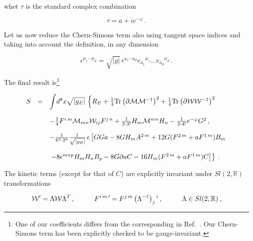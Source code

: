 \documentclass[12pt,a4paper]{article}
\begin{document}
\noindent whet $\tau$ is the standard complex combination

\begin{equation}
\tau= a+ie^{-\varphi}\, .  
\end{equation}
 
Let us now reduce the Chern-Simons term also using tangent space indices
and taking into account the definition, in any dimension

\begin{equation}
\epsilon^{\mu_{1}\cdots\mu_{d}} = \sqrt{|g|}\, \epsilon^{a_{1}\cdots a_{d}} 
e_{a_{1}}{}^{\mu_{1}} \ldots e_{a_{d}}{}^{\mu_{d}} \, .
\end{equation}

The final result is\footnote{One of our coefficients differs from the
  corresponding in Ref.~\cite{kn:SaSe}. Our Chern-Simons term has been
  explicitly checked to be gauge-invariant.}

\begin{equation}
\label{eq:d8masslessaction}
  \begin{array}{rcl}
S & = & {\displaystyle\int} d^{8}x \sqrt{|g_{E}|}\,
\left\{ 
R_{E} 
+\frac{1}{4}{\rm Tr}\left(\partial {\cal M}{\cal M}^{-1}\right)^{2}
+\frac{1}{4}{\rm Tr}\left(\partial {\cal W}{\cal W}^{-1}\right)^{2}
 \right.\\
& & \\
& & 
-\frac{1}{4}F^{i\, m}{\cal M}_{mn}{\cal W}_{ij} F^{j\, n}
+\frac{1}{2\cdot 3!} H_{m}{\cal M}^{mn} H_{n}
-\frac{1}{2\cdot 4!} e^{-\varphi} G^{2} \, ,\\
& & \\
& & 
-\frac{1}{6^{3}\cdot 2^{4}}
{\textstyle\frac{1}{\sqrt{|g_{E}|}}}\, \epsilon
\left[GGa -8G H_{m} A^{2\, m} +12 G(F^{2\, m}+aF^{1\, m})B_{m} \right.\\
&& \\
& & 
\left.\left.
-8\epsilon^{mnp} H_{m}H_{n}B_{p} -8G\partial a C 
-16 H_{m}(F^{2\, m}+aF^{1\, m}) C \right]\right\} \, .\\
\end{array}
\end{equation}

The kinetic terms (except for that of $C$) are explicitly invariant under
$Sl(2,\mathbb{R})$  transformations

\begin{equation}
\label{eq:sl2rules1}
{\cal W}^{\prime} = \Lambda {\cal W} \Lambda^{T}\, ,\\
\hspace{1cm}
F^{i\, m\, \prime} = F^{j\, m}\left( \Lambda^{-1} \right)_{j}{}^{i}\, ,
\hspace{1cm}
\Lambda \in Sl(2,\mathbb{R})\, ,
\end{equation}
\end{document}
